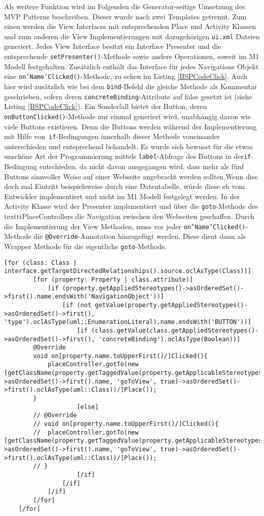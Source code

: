 Als weitere Funktion wird im Folgenden die Generator-seitige Umsetzung des MVP Patterns beschreiben. Dieser wurde nach zwei Templates getrennt. Zum einen werden die View Interfaces mit entsprechenden Place und Activity Klassen und zum anderen die View Implementierungen mit dazugehörigen \texttt{ui.xml} Dateien generiert.
Jedes View Interface besitzt ein Interface Presenter und die entsprechende \texttt{setPresenter()}-Methode sowie andere Operationen, soweit im M1 Modell festgehalten. Zusätzlich enthält das Interface für jedes Navigations Objekt eine \texttt{on'Name'Clicked()}-Methode, zu sehen im Listing \ref{BSPCodeClick}. Auch hier wird zusätzlich wie bei dem \texttt{bind}-Befehl die gleiche Methode als Kommentar geschrieben, sofern deren \texttt{concreteBinding}-Attribute auf false gesetzt ist (siehe Listing \ref{BSPCodeClick}). Ein Sonderfall bietet der Button, deren \texttt{onButtonClicked()}-Methode nur einmal generiert wird, unabhängig davon wie viele Buttons existieren. Denn die Buttons werden während der Implementierung mit Hilfe von\texttt{ if}-Bedingungen innerhalb dieser Methode voneinander unterschieden und entsprechend behandelt. Es wurde sich bewusst für die etwas unschöne Art der Programmierung mittels \texttt{label}-Abfrage des Buttons in der\texttt{if}-Bedingung entschieden, da nicht davon ausgegangen wird, dass mehr als fünf Buttons sinnvoller Weise auf einer Webseite angebracht werden sollten.Wenn dies doch mal Eintritt beispielsweise durch eine Datentabelle, würde diese eh vom Entwickler implementiert und nicht im M1 Modell festgelegt werden.
In der Activity Klasse wird der Presenter implementiert und über die \texttt{goto}-Methode des texttt{PlaceController}s die Navigation zwischen den Webseiten geschaffen. Durch die Implementierung der View Methoden, muss vor jeder \texttt{on'Name'Clicked()}-Methode die \texttt{@Override}-Annotation hinzugefügt werden. Diese dient dann als Wrapper Methode für die eigentliche \texttt{goto}-Methode.
\lstset{language=OCL}
\begin{lstlisting}[caption={Auszug der Generieung der on'Name'Clicked() Methode}, label={BSPCodeClick}]
[for (class: Class | interface.getTargetDirectedRelationships().source.oclAsType(Class))]
		[for (property: Property | class.attribute)]
			[if (property.getAppliedStereotypes()->asOrderedSet()->first().name.endsWith('NavigationObject'))]
				[if (not getValue(property.getAppliedStereotypes()->asOrderedSet()->first(), 'type').oclAsType(uml::EnumerationLiteral).name.endsWith('BUTTON'))]
					[if (class.getValue(class.getAppliedStereotypes()->asOrderedSet()->first(), 'concreteBinding').oclAsType(Boolean))]						
		@Override
		void on[property.name.toUpperFirst()/]Clicked(){
			placeController.gotTo(new [getClassName(property.getTaggedValue(property.getApplicableStereotypes()->asOrderedSet()->first().name, 'goToView', true)->asOrderedSet()->first().oclAsType(uml::Class))/]Place());
		}
					[else]
		// @Override
		// void on[property.name.toUpperFirst()/]Clicked(){
		//	placeController.gotTo(new [getClassName(property.getTaggedValue(property.getApplicableStereotypes()->asOrderedSet()->first().name, 'goToView', true)->asOrderedSet()->first().oclAsType(uml::Class))/]Place());
		// }
					[/if]
				[/if]
			[/if]
		[/for]
	[/for]
\end{lstlisting}

